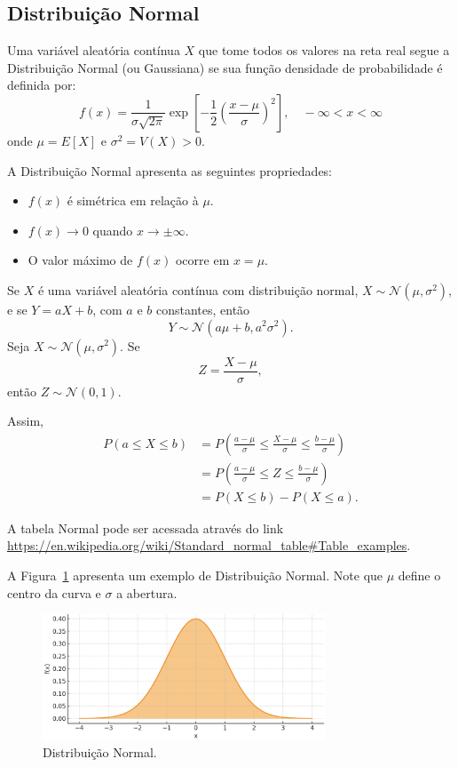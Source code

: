 \documentclass{article}
\begin{document}
\subsection{Distribuição Normal}
Uma variável aleatória contínua $X$ que tome todos os valores na reta real segue a Distribuição Normal (ou Gaussiana) se sua função densidade de probabilidade é definida por:
    $$
    f(x) = \frac{1}{\sigma \sqrt{2\pi}} \exp\left[ -\frac{1}{2} \left( \frac{x - \mu}{\sigma} \right)^2 \right], \quad -\infty < x < \infty
    $$
onde $\mu = E[X]$ e $\sigma^2 = V(X) > 0$.


A Distribuição Normal apresenta as seguintes propriedades:
\begin{itemize}
    \item $f(x)$ é simétrica em relação à $\mu$.
    \item $f(x) \to 0$ quando $x \to \pm\infty$.
    \item O valor máximo de $f(x)$ ocorre em $x = \mu$.
\end{itemize}


Se $X$ é uma variável aleatória contínua com distribuição normal, $X \sim \mathcal{N}(\mu, \sigma^2)$, e se $Y = aX + b$, com $a$ e $b$ constantes, então
    $$
    Y \sim \mathcal{N}(a\mu + b, a^2\sigma^2).
    $$
Seja $X \sim \mathcal{N}(\mu, \sigma^2)$. Se
    $$
    Z = \frac{X - \mu}{\sigma},
    $$
então $Z \sim \mathcal{N}(0, 1)$.

Assim,
\begin{align*}
    P(a \leq X \leq b) &= P\left( \frac{a - \mu}{\sigma} \leq \frac{X - \mu}{\sigma} \leq \frac{b - \mu}{\sigma} \right) \\
    &= P\left( \frac{a - \mu}{\sigma} \leq Z \leq \frac{b - \mu}{\sigma} \right) \\
    &= P(X \leq b) - P(X \leq a).
\end{align*}

A tabela Normal pode ser acessada através do link \url{https://en.wikipedia.org/wiki/Standard_normal_table#Table_examples}.

A Figura~\ref{fig:dist_cont_normal} apresenta um exemplo de Distribuição Normal. Note que $\mu$ define o centro da curva e $\sigma$ a abertura.

\begin{figure}[H]
    \centering    \includegraphics[width=0.75\textwidth]{figuras/dist_cont_normal.png}
    \caption{Distribuição Normal.}
    \label{fig:dist_cont_normal}
\end{figure}
\end{document}
